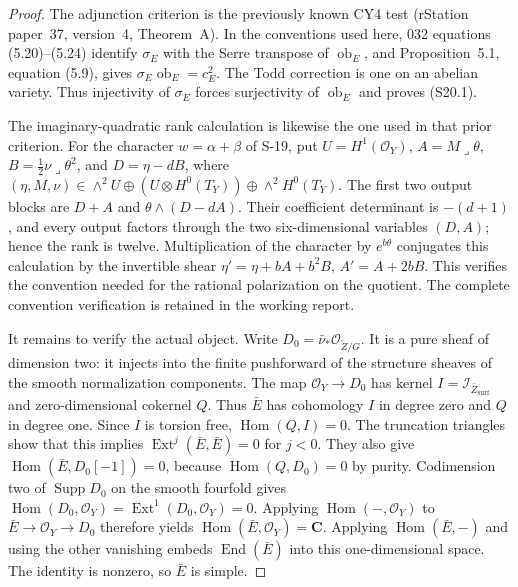 \begin{proof}
The adjunction criterion is the previously known CY4 test
(rStation paper~37, version~4, Theorem~A). In the conventions
used here, 032 equations (5.20)--(5.24) identify $\sigma_E$
with the Serre transpose of $\operatorname{ob}_E$, and
Proposition~5.1, equation (5.9), gives
$\sigma_E\operatorname{ob}_E=c_E^2$. The Todd correction is
one on an abelian variety. Thus injectivity of $\sigma_E$
forces surjectivity of $\operatorname{ob}_E$ and proves
(S20.1).

The imaginary-quadratic rank calculation is likewise the
one used in that prior criterion. For the character
$w=\alpha+\beta$ of S-19, put $U=H^1(\mathcal O_Y)$,
$A=M\mathbin{\lrcorner}\theta$,
$B=\tfrac12\nu\mathbin{\lrcorner}\theta^2$, and
$D=\eta-dB$, where
$(\eta,M,\nu)\in\wedge^2U\oplus(U\otimes H^0(T_Y))
\oplus\wedge^2H^0(T_Y)$.
The first two output blocks are
$D+A$ and $\theta\wedge(D-dA)$.
Their coefficient determinant is $-(d+1)$, and every output
factors through the two six-dimensional variables $(D,A)$;
hence the rank is twelve. Multiplication of the character
by $e^{b\theta}$ conjugates this calculation by the invertible
shear $\eta'=\eta+bA+b^2B$, $A'=A+2bB$.
This verifies the convention needed for the rational
polarization on the quotient. The complete convention
verification is retained in the working report.

It remains to verify the actual object. Write
$D_0=\bar\nu_*\mathcal O_{\widetilde Z/G}$.
It is a pure sheaf of dimension two: it injects into the
finite pushforward of the structure sheaves of the smooth
normalization components. The map $\mathcal O_Y\to D_0$
has kernel $I=\mathcal I_{\bar Z_{\mathrm{surf}}}$ and
zero-dimensional cokernel $Q$. Thus $\bar E$ has cohomology
$I$ in degree zero and $Q$ in degree one.
Since $I$ is torsion free,
$\operatorname{Hom}(Q,I)=0$. The truncation triangles show
that this implies
$\operatorname{Ext}^{j}(\bar E,\bar E)=0$ for $j<0$.
They also give
$\operatorname{Hom}(\bar E,D_0[-1])=0$, because
$\operatorname{Hom}(Q,D_0)=0$ by purity.
Codimension two of $\operatorname{Supp}D_0$ on the smooth
fourfold gives
$\operatorname{Hom}(D_0,\mathcal O_Y)
=\operatorname{Ext}^1(D_0,\mathcal O_Y)=0$.
Applying $\operatorname{Hom}(-,\mathcal O_Y)$ to
$\bar E\to\mathcal O_Y\to D_0$ therefore yields
$\operatorname{Hom}(\bar E,\mathcal O_Y)=\mathbf C$.
Applying $\operatorname{Hom}(\bar E,-)$ and using the other
vanishing embeds $\operatorname{End}(\bar E)$ into this
one-dimensional space. The identity is nonzero, so
$\bar E$ is simple.


\end{proof}

